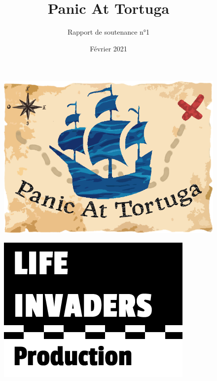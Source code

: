 \documentclass[french, 12pt]{article}
\title{\fontfamily{phv}\selectfont \Huge \textbf{Panic At Tortuga}}
\author{\fontfamily{phv}\Huge{Rapport de soutenance n°1}}
\date{\fontfamily{phv}\selectfont Février 2021}
\begin{document}
\begin{titlepage}
    \maketitle
    
    \thispagestyle{empty}
    \vspace{20pt}
    \begin{figure}[hbt!]
        \centering
        \includegraphics[scale=0.5]{logo.png}
    \end{figure}
    \vspace{70pt}

    \begin{figure}[hbt!]
        \centering
        \includegraphics[scale=0.4]{logo_lifeinvaders_copie.png}
    \end{figure}
\end{titlepage}
\end{document}
